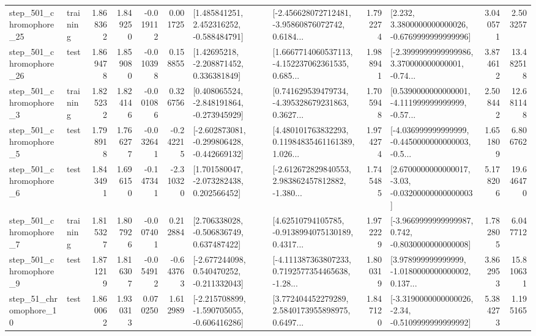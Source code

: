 \begin{tabular}{llrrrrllrlrr}
  step\_501\_chromophore\_25 &  training &      1.868362 &    1.849250 &     -0.019112 &  0.001725 &    [1.485841251, 2.452316252, -0.588484791] &  [-2.456628072712481, -3.95860876072742, 0.6184... &       1.792274 &   [2.232, 3.3800000000000026, -0.6769999999999996] &            3.040571 &          2.503257 \\
  step\_501\_chromophore\_26 &      test &      1.869478 &    1.859080 &     -0.010398 &  0.158855 &     [1.42695218, -2.208871452, 0.336381849] &  [1.6667714060537113, -4.152237062361535, 0.685... &       1.988941 &  [-2.3999999999999986, 3.370000000000001, -0.74... &            3.874612 &         13.482518 \\
   step\_501\_chromophore\_3 &  training &      1.825232 &    1.824146 &     -0.001086 &  0.326756 &   [0.408065524, -2.848191864, -0.273945929] &  [0.741629539479734, -4.395328679231863, 0.3627... &       1.705948 &  [0.5390000000000001, -4.111999999999999, -0.57... &            2.508442 &         12.681148 \\
   step\_501\_chromophore\_5 &      test &      1.798918 &    1.766277 &     -0.032641 & -0.242215 &  [-2.602873081, -0.299806428, -0.442669132] &  [4.480101763832293, 0.11984835461161389, 1.026... &       1.974274 &  [-4.036999999999999, -0.4450000000000003, -0.5... &            1.651809 &          6.806762 \\
   step\_501\_chromophore\_6 &      test &      1.843491 &    1.696150 &     -0.147341 & -2.310320 &    [1.701580047, -2.073282438, 0.202566452] &  [-2.612672829840553, 2.983862457812882, -1.380... &       1.745485 &  [2.6700000000000017, -3.03, -0.03200000000000003] &            5.178206 &         19.646470 \\
   step\_501\_chromophore\_7 &  training &      1.815327 &    1.807926 &     -0.007401 &  0.212884 &    [2.706338028, -0.506836749, 0.637487422] &  [4.62510794105785, -0.9138994075130189, 0.4317... &       1.972229 &  [-3.9669999999999987, 0.742, -0.8030000000000008] &            1.782805 &          6.047712 \\
   step\_501\_chromophore\_9 &      test &      1.871219 &    1.816307 &     -0.054912 & -0.643763 &   [-2.677244098, 0.540470252, -0.211332043] &  [-4.111387363807233, 0.7192577354465638, -1.28... &       1.800319 &  [3.978999999999999, -1.0180000000000002, 0.137... &            3.862953 &         15.810631 \\
   step\_51\_chromophore\_10 &      test &      1.860062 &    1.930313 &      0.070250 &  1.612989 &  [-2.215708899, -1.590705055, -0.606416286] &  [3.772404452279289, 2.5840173955898975, 0.6497... &       1.847120 &  [-3.3190000000000026, -2.34, -0.5109999999999992] &            5.384273 &          1.195165 \\

\end{tabular}
